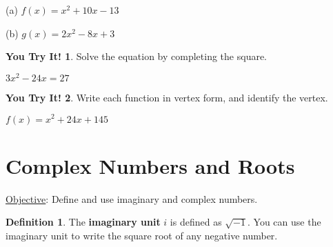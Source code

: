 \documentclass{report}
\theoremstyle{definition}
\newtheorem{definition}{\bf Definition}[section]
\newtheorem{youtry}{\textbf{You Try It!}}
\begin{document}
\begin{minipage}[t]{0.45\linewidth}
(a)  $f(x)=x^2+10x-13$
\end{minipage}
\hfill
\begin{minipage}[t]{0.45\linewidth}
(b)  $g(x)=2x^2-8x+3$
\end{minipage}


\vfill


\hspace{-0.8cm}
\begin{minipage}[t]{0.45\linewidth}
\begin{youtry}
Solve the equation by completing the square.
\end{youtry}
  $3x^2-24x=27$
\end{minipage}
\hfill
\begin{minipage}[t]{0.45\linewidth}
\begin{youtry}
Write each function in vertex form, and identify the vertex.
\end{youtry}
$f(x) = x^2+24x+145$
\end{minipage}
\vfill
\vfill
 \noindent{}
 \newpage

 \section{ Complex Numbers and Roots }
 \setcounter{example}{0}
 \setcounter{definition}{0}
  \setcounter{youtry}{0}
 \hfill \underline{Objective}: Define and use imaginary and complex numbers.\\
 \begin{definition}
 The \textbf{imaginary unit} $i$ is defined as $\sqrt{-1}$. You can use the imaginary unit to write the square  root of any negative number.
 \end{definition}
 
 
\vspace{-0.75cm}
 
\end{document}
